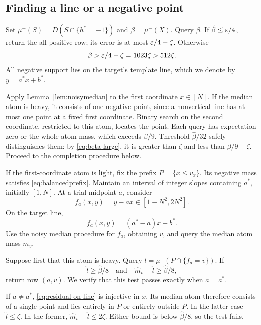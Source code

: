 \subsection{Finding a line or a negative point}
Set $\mu^-(S)=D(S\cap\{h^*=-1\})$ and $\beta=\mu^-(X)$. Query $\beta$. If $\hat\beta\le\varepsilon/4$, return the all-positive row; its error is at most $\varepsilon/4+\zeta$. Otherwise
\begin{equation}
 \beta>\varepsilon/4-\zeta=1023\zeta>512\zeta.
\label{eq:beta-large}
\end{equation}
All negative support lies on the target's template line, which we denote by $y=a^*x+b^*$.

Apply Lemma~\ref{lem:noisymedian} to the first coordinate $x\in[N]$. If the median atom is heavy, it consists of one negative point, since a nonvertical line has at most one point at a fixed first coordinate. Binary search on the second coordinate, restricted to this atom, locates the point. Each query has expectation zero or the whole atom mass, which exceeds $\beta/9$. Threshold $\hat\beta/32$ safely distinguishes them: by \eqref{eq:beta-large}, it is greater than $\zeta$ and less than $\beta/9-\zeta$. Proceed to the completion procedure below.

If the first-coordinate atom is light, fix the prefix $P=\{x\le v_x\}$. Its negative mass satisfies \eqref{eq:balancedprefix}. Maintain an interval of integer slopes containing $a^*$, initially $[1,N]$. At a trial midpoint $a$, consider
\[
 f_a(x,y)=y-ax\in[1-N^2,2N^2].
\]
On the target line,
\begin{equation}
 f_a(x,y)=(a^*-a)x+b^*.
\label{eq:residual-on-line}
\end{equation}
Use the noisy median procedure for $f_a$, obtaining $v$, and query the median atom mass $m_v$.

Suppose first that this atom is heavy. Query $l=\mu^-(P\cap\{f_a=v\})$. If
\begin{equation}
 \hat l\ge\hat\beta/8\quad\text{and}\quad
 \hat m_v-\hat l\ge\hat\beta/8,
\label{eq:split-test}
\end{equation}
return row $(a,v)$. We verify that this test passes exactly when $a=a^*$.

If $a\ne a^*$, \eqref{eq:residual-on-line} is injective in $x$. Its median atom therefore consists of a single point and lies entirely in $P$ or entirely outside $P$. In the latter case $\hat l\le\zeta$. In the former, $\hat m_v-\hat l\le2\zeta$. Either bound is below $\hat\beta/8$, so the test fails.

